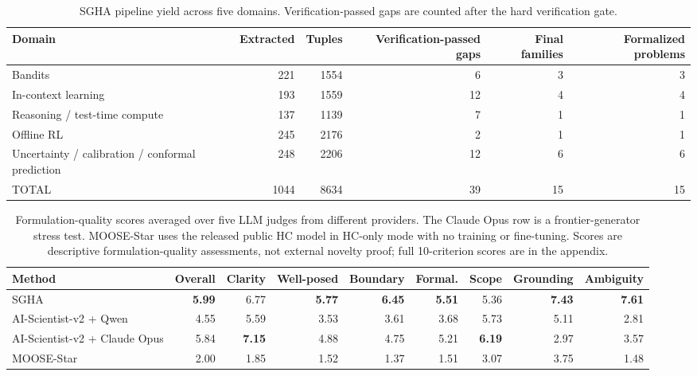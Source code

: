 

\begin{table}[htbp]
\centering
\caption{SGHA pipeline yield across five domains. Verification-passed gaps are counted after the hard verification gate.}
\label{tab:sgha\_pipeline\_yield}
\begin{tabular}{lrrrrr}
\toprule
Domain & Extracted & Tuples & Verification-passed gaps & Final families & Formalized problems \\
\midrule
Bandits & 221 & 1554 & 6 & 3 & 3 \\
In-context learning & 193 & 1559 & 12 & 4 & 4 \\
Reasoning / test-time compute & 137 & 1139 & 7 & 1 & 1 \\
Offline RL & 245 & 2176 & 2 & 1 & 1 \\
Uncertainty / calibration / conformal prediction & 248 & 2206 & 12 & 6 & 6 \\
TOTAL & 1044 & 8634 & 39 & 15 & 15 \\
\bottomrule
\end{tabular}
\end{table}

\begin{table}[t]
\centering
\small
\caption{Formulation-quality scores averaged over five LLM judges from different providers. The Claude Opus row is a frontier-generator stress test. MOOSE-Star uses the released public HC model in HC-only mode with no training or fine-tuning. Scores are descriptive formulation-quality assessments, not external novelty proof; full 10-criterion scores are in the appendix.}
\label{tab:formulation_quality_with_moose}
\begin{tabular}{lrrrrrrrr}
\toprule
Method & Overall & Clarity & Well-posed & Boundary & Formal. & Scope & Grounding & Ambiguity \\
\midrule
SGHA & \textbf{5.99} & 6.77 & \textbf{5.77} & \textbf{6.45} & \textbf{5.51} & 5.36 & \textbf{7.43} & \textbf{7.61} \\
AI-Scientist-v2 + Qwen & 4.55 & 5.59 & 3.53 & 3.61 & 3.68 & 5.73 & 5.11 & 2.81 \\
AI-Scientist-v2 + Claude Opus & 5.84 & \textbf{7.15} & 4.88 & 4.75 & 5.21 & \textbf{6.19} & 2.97 & 3.57 \\
MOOSE-Star & 2.00 & 1.85 & 1.52 & 1.37 & 1.51 & 3.07 & 3.75 & 1.48 \\
\bottomrule
\end{tabular}
\end{table}

